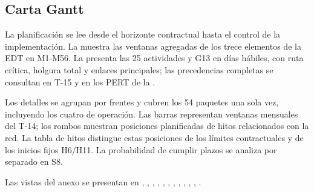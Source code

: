 \subsection{Carta Gantt}\label{sec:7-gantt}

La planificación se lee desde el horizonte contractual hasta el control de la implementación. La  muestra las ventanas agregadas de los trece elementos de la EDT en M1-M56. La  presenta las 25 actividades y G13 en días hábiles, con ruta crítica, holgura total y enlaces principales; las precedencias completas se consultan en T-15 y en los PERT de la .

Los detalles se agrupan por frentes y cubren los 54 paquetes una sola vez, incluyendo los cuatro de operación. Las barras representan ventanas mensuales del T-14; los rombos muestran posiciones planificadas de hitos relacionados con la red. La tabla de hitos distingue estas posiciones de los límites contractuales y de los inicios fijos H6/H11. La probabilidad de cumplir plazos se analiza por separado en S8.

Las vistas del anexo se presentan en , , , , , , , , , , , .

